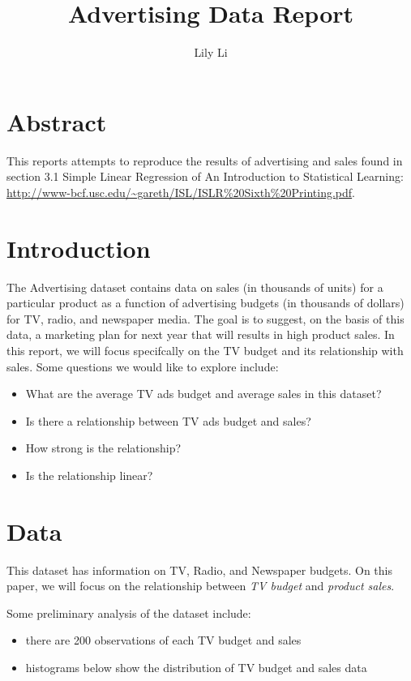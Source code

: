 \documentclass{article}\usepackage[]{graphicx}\usepackage[]{color}
\begin{document}
\title{Advertising Data Report}
\author{Lily Li}
\maketitle

\section{Abstract}

This reports attempts to reproduce the results of advertising and sales found in section 3.1 Simple Linear Regression of An Introduction to Statistical Learning: \url{http://www-bcf.usc.edu/~gareth/ISL/ISLR%20Sixth%20Printing.pdf}.


\section{Introduction}

The Advertising dataset contains data on sales (in thousands of units) for a particular product as a function of advertising budgets (in thousands of dollars) for TV, radio, and newspaper media. The goal is to suggest, on the basis of this data, a marketing plan for next year that will results in high product sales. In this report, we will focus specifcally on the TV budget and its relationship with sales. Some questions we would like to explore include:

\begin{itemize}
\item What are the average TV ads budget and average sales in this dataset?
\item Is there a relationship between TV ads budget and sales?
\item How strong is the relationship?
\item Is the relationship linear?  
\end{itemize}


\section{Data}

This dataset has information on TV, Radio, and Newspaper budgets. On this paper, we will focus on the relationship between \emph{TV budget} and \emph{product sales}.  

Some preliminary analysis of the dataset include:  


\begin{itemize}
\item there are 200 observations of each TV budget and sales
\item histograms below show the distribution of TV budget and sales data
\end{itemize}
\end{document}
